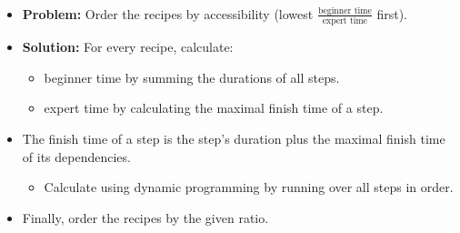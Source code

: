 \begin{frame}
    \frametitle{\problemtitle}
    \begin{itemize}
        \item<+-> \textbf{Problem:} Order the recipes by accessibility
                    (lowest $\frac{\text{beginner time}}{\text{expert time}}$ first).
        \item<+-> \textbf{Solution:} For every recipe, calculate:
        \begin{itemize}
            \item beginner time by summing the durations of all steps.
            \item expert time by calculating the maximal finish time of a step.
        \end{itemize}
        \item<+-> The finish time of a step is the step's duration plus the maximal finish time of its dependencies.
        \begin{itemize}
            \item Calculate using dynamic programming by running over all steps in order.
        \end{itemize}
        \item<+-> Finally, order the recipes by the given ratio.
    \end{itemize}
    \solvestats
\end{frame}
